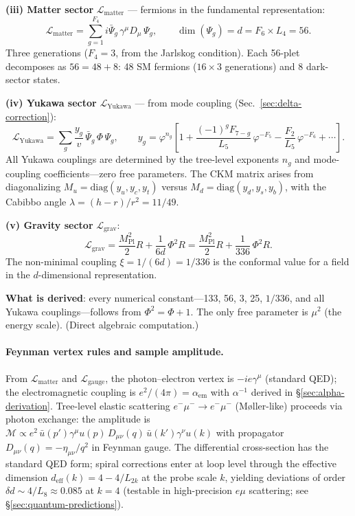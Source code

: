 \documentclass[12pt,a4paper]{article}
\begin{document}
\textbf{(iii) Matter sector} $\mathcal{L}_{\text{matter}}$ --- fermions in the fundamental representation:
\begin{equation}
\mathcal{L}_{\text{matter}} = \sum_{g=1}^{F_4} i\bar\Psi_g\,\gamma^\mu D_\mu\,\Psi_g, \qquad \dim(\Psi_g) = d = F_6 \times L_4 = 56.
\label{eq:Dirac}
\end{equation}
Three generations ($F_4 = 3$, from the Jarlskog condition). Each 56-plet decomposes as $56 = 48 + 8$: 48 SM fermions ($16 \times 3$ generations) and 8 dark-sector states.

\textbf{(iv) Yukawa sector} $\mathcal{L}_{\text{Yukawa}}$ --- from mode coupling (Sec.~\ref{sec:delta-correction}):
\begin{equation}
\mathcal{L}_{\text{Yukawa}} = \sum_g \frac{y_g}{v}\,\bar\Psi_g\,\Phi\,\Psi_g, \qquad y_g = \varphi^{n_g}\left[1 + \frac{(-1)^g F_{7-g}}{L_5}\,\varphi^{-F_5} - \frac{F_2}{L_5}\,\varphi^{-F_6} + \cdots\right].
\label{eq:yukawa}
\end{equation}
All Yukawa couplings are determined by the tree-level exponents $n_g$ and mode-coupling coefficients---zero free parameters. The CKM matrix arises from diagonalizing $M_u = \mathrm{diag}(y_u, y_c, y_t)$ versus $M_d = \mathrm{diag}(y_d, y_s, y_b)$, with the Cabibbo angle $\lambda = (h{-}r)/r^2 = 11/49$.

\textbf{(v) Gravity sector} $\mathcal{L}_{\text{grav}}$:
\begin{equation}
\mathcal{L}_{\text{grav}} = \frac{M_{\mathrm{Pl}}^2}{2}R + \frac{1}{6d}\,\Phi^2 R = \frac{M_{\mathrm{Pl}}^2}{2}R + \frac{1}{336}\,\Phi^2 R.
\label{eq:EH}
\end{equation}
The non-minimal coupling $\xi = 1/(6d) = 1/336$ is the conformal value for a field in the $d$-dimensional representation.

\textbf{What is derived}: every numerical constant---133, 56, 3, 25, $1/336$, and all Yukawa couplings---follows from $\Phi^2 = \Phi + 1$. The only free parameter is $\mu^2$ (the energy scale). (Direct algebraic computation.)

\paragraph{Feynman vertex rules and sample amplitude.}
From $\mathcal{L}_{\mathrm{matter}}$ and $\mathcal{L}_{\text{gauge}}$, the photon--electron vertex is $-ie\gamma^\mu$ (standard QED); the electromagnetic coupling is $e^2/(4\pi) = \alpha_{\mathrm{em}}$ with $\alpha^{-1}$ derived in \S\ref{sec:alpha-derivation}. Tree-level elastic scattering $e^-\mu^- \to e^-\mu^-$ (Møller-like) proceeds via photon exchange: the amplitude is $\mathcal{M} \propto e^2\,\bar{u}(p')\gamma^\mu u(p)\, D_{\mu\nu}(q)\, \bar{u}(k')\gamma^\nu u(k)$ with propagator $D_{\mu\nu}(q) = -\eta_{\mu\nu}/q^2$ in Feynman gauge. The differential cross-section has the standard QED form; spiral corrections enter at loop level through the effective dimension $d_{\mathrm{eff}}(k) = 4 - 4/L_{2k}$ at the probe scale $k$, yielding deviations of order $\delta d \sim 4/L_8 \approx 0.085$ at $k = 4$ (testable in high-precision $e\mu$ scattering; see \S\ref{sec:quantum-predictions}).
\end{document}
